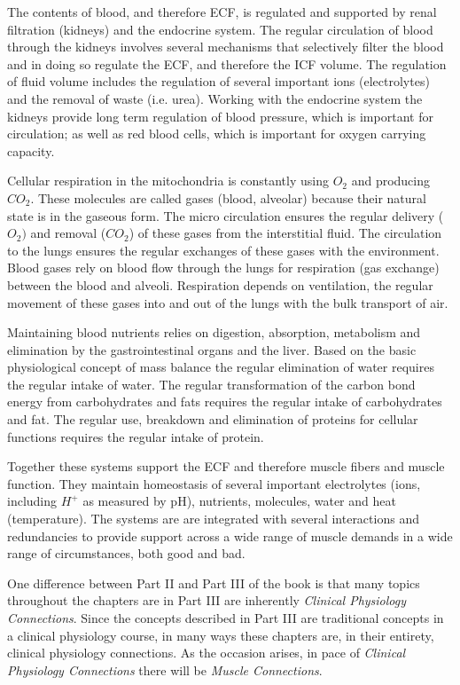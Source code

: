 \begin{partbacktext}
The contents of blood, and therefore ECF, is regulated and supported by renal filtration (kidneys) and the endocrine system. The regular circulation of blood through the kidneys involves several mechanisms that selectively filter the blood and in doing so regulate the ECF, and therefore the ICF volume. The regulation of fluid volume includes the regulation of several important ions (electrolytes) and the removal of waste (i.e. urea). Working with the endocrine system the kidneys provide long term regulation of blood pressure, which is important for circulation; as well as red blood cells, which is important for oxygen carrying capacity.

Cellular respiration in the mitochondria is constantly using $O_2$ and producing $CO_2$. These molecules are called gases (blood, alveolar) because their natural state is in the gaseous form. The micro circulation ensures the regular delivery ($O_2)$ and removal ($CO_2$) of these gases from the interstitial fluid. The circulation to the lungs ensures the regular exchanges of these gases with the environment. Blood gases rely on blood flow through the lungs for respiration (gas exchange) between the blood and alveoli. Respiration depends on ventilation, the regular movement of these gases into and out of the lungs with the bulk transport of air. 

Maintaining blood nutrients relies on digestion, absorption, metabolism and elimination by the gastrointestinal organs and the liver. Based on the basic physiological concept of mass balance the regular elimination of water requires the regular intake of water. The regular transformation of the carbon bond energy from carbohydrates and fats requires the regular intake of carbohydrates and fat. The regular use, breakdown and elimination of proteins for cellular functions requires the regular intake of protein. 

Together these systems support the ECF and therefore muscle fibers and muscle function. They maintain homeostasis of several important electrolytes (ions, including $H^+$ as measured by pH), nutrients, molecules, water and heat (temperature). The systems are are integrated with several interactions and redundancies to provide support across a wide range of muscle demands in a wide range of circumstances, both good and bad.

One difference between Part II and Part III of the book is that many topics throughout the chapters are in Part III are inherently \textit{Clinical Physiology Connections}. Since the concepts described in Part III are traditional concepts in a clinical physiology course, in many ways these chapters are, in their entirety, clinical physiology connections. As the occasion arises, in pace of \textit{Clinical Physiology Connections} there will be \textit{Muscle Connections}.

\end{partbacktext}